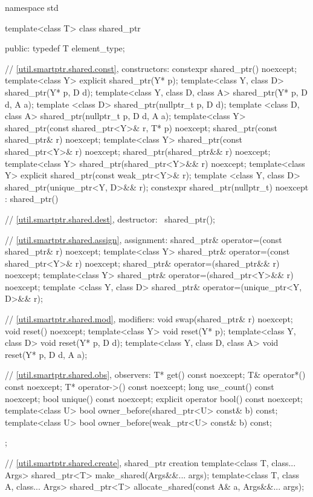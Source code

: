 \begin{codeblock}
namespace std {
  template<class T> class shared_ptr {
  public:
    typedef T element_type;

    // \ref{util.smartptr.shared.const}, constructors:
    constexpr shared_ptr() noexcept;
    template<class Y> explicit shared_ptr(Y* p);
    template<class Y, class D> shared_ptr(Y* p, D d);
    template<class Y, class D, class A> shared_ptr(Y* p, D d, A a);
    template <class D> shared_ptr(nullptr_t p, D d);
    template <class D, class A> shared_ptr(nullptr_t p, D d, A a);
    template<class Y> shared_ptr(const shared_ptr<Y>& r, T* p) noexcept;
    shared_ptr(const shared_ptr& r) noexcept;
    template<class Y> shared_ptr(const shared_ptr<Y>& r) noexcept;
    shared_ptr(shared_ptr&& r) noexcept;
    template<class Y> shared_ptr(shared_ptr<Y>&& r) noexcept;
    template<class Y> explicit shared_ptr(const weak_ptr<Y>& r);
    template <class Y, class D> shared_ptr(unique_ptr<Y, D>&& r);
    constexpr shared_ptr(nullptr_t) noexcept : shared_ptr() { }

    // \ref{util.smartptr.shared.dest}, destructor:
    ~shared_ptr();

    // \ref{util.smartptr.shared.assign}, assignment:
    shared_ptr& operator=(const shared_ptr& r) noexcept;
    template<class Y> shared_ptr& operator=(const shared_ptr<Y>& r) noexcept;
    shared_ptr& operator=(shared_ptr&& r) noexcept;
    template<class Y> shared_ptr& operator=(shared_ptr<Y>&& r) noexcept;
    template <class Y, class D> shared_ptr& operator=(unique_ptr<Y, D>&& r);

    // \ref{util.smartptr.shared.mod}, modifiers:
    void swap(shared_ptr& r) noexcept;
    void reset() noexcept;
    template<class Y> void reset(Y* p);
    template<class Y, class D> void reset(Y* p, D d);
    template<class Y, class D, class A> void reset(Y* p, D d, A a);

    // \ref{util.smartptr.shared.obs}, observers:
    T* get() const noexcept;
    T& operator*() const noexcept;
    T* operator->() const noexcept;
    long use_count() const noexcept;
    bool unique() const noexcept;
    explicit operator bool() const noexcept;
    template<class U> bool owner_before(shared_ptr<U> const& b) const;
    template<class U> bool owner_before(weak_ptr<U> const& b) const;
  };

  // \ref{util.smartptr.shared.create}, shared_ptr creation
  template<class T, class... Args> shared_ptr<T> make_shared(Args&&... args);
  template<class T, class A, class... Args>
    shared_ptr<T> allocate_shared(const A& a, Args&&... args);

}
\end{codeblock}
